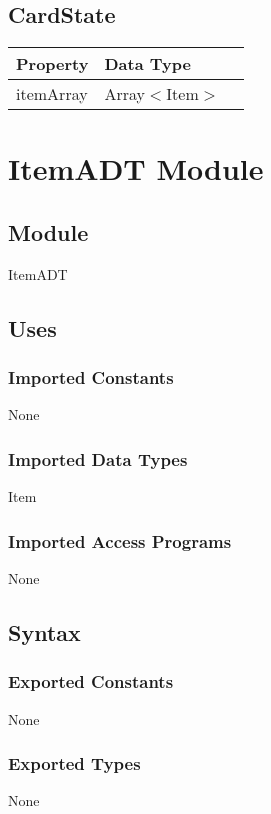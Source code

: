 \documentclass[12pt]{article}
\begin{document}
\subsection{CardState}
\begin{tabular}{| l | l | p{6cm} |}
  \hline
  \textbf{Property} & \textbf{Data Type}\\
  \hline
  itemArray & Array$<$Item$>$\\
  \hline
  \end{tabular}







\newpage
\section*{ItemADT Module}

\subsection{Module}
ItemADT

\bigskip
\subsection{Uses}
\subsubsection{Imported Constants}
None

\subsubsection{Imported Data Types}
Item

\subsubsection{Imported Access Programs}
None

\bigskip
\subsection{Syntax}
\subsubsection{Exported Constants}
None

\subsubsection{Exported Types}
None
 
\end{document}
